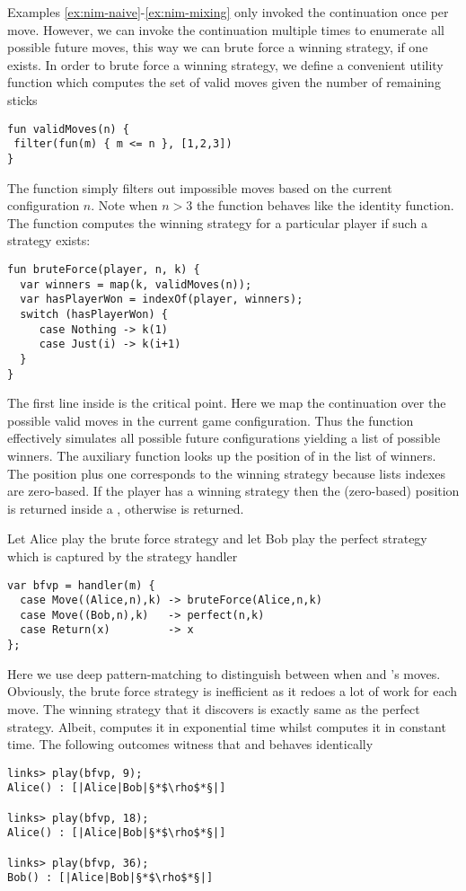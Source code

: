\begin{example}\label{ex:nim-brute-force}
Examples \ref{ex:nim-naive}-\ref{ex:nim-mixing} only invoked the continuation once per move. However, we can invoke the continuation multiple times to enumerate all possible future moves, this way we can brute force a winning strategy, if one exists. In order to brute force a winning strategy, we define a convenient utility function which computes the set of valid moves given the number of remaining sticks
\begin{lstlisting}[style=links]
fun validMoves(n) {
 filter(fun(m) { m <= n }, [1,2,3])
}
\end{lstlisting}
The function simply filters out impossible moves based on the current configuration $n$. Note when $n > 3$ the function  behaves like the identity function.
The function  computes the winning strategy for a particular player if such a strategy exists:
\begin{lstlisting}[style=links]
fun bruteForce(player, n, k) {
  var winners = map(k, validMoves(n));
  var hasPlayerWon = indexOf(player, winners);
  switch (hasPlayerWon) {
     case Nothing -> k(1)
     case Just(i) -> k(i+1)
  }
}
\end{lstlisting}
The first line inside  is the critical point. Here we map the continuation  over the possible valid moves in the current game configuration. Thus the function effectively simulates all possible future configurations yielding a list of possible winners. The auxiliary function  looks up the position of  in the list of winners. The position plus one corresponds to the winning strategy because lists indexes are zero-based. If the player has a winning strategy then the (zero-based) position is returned inside a , otherwise  is returned.

Let Alice play the brute force strategy and let Bob play the perfect strategy which is captured by the strategy handler 
\begin{lstlisting}[style=links]
var bfvp = handler(m) {
  case Move((Alice,n),k) -> bruteForce(Alice,n,k)
  case Move((Bob,n),k)   -> perfect(n,k)
  case Return(x)         -> x
};
\end{lstlisting}
Here we use deep pattern-matching to distinguish between when  and 's moves. Obviously, the brute force strategy is inefficient as it redoes a lot of work for each move. The winning strategy that it discovers is exactly same as the perfect strategy. Albeit,  computes it in exponential time whilst  computes it in constant time. The following outcomes witness that  and  behaves identically
\begin{lstlisting}[style=links]
links> play(bfvp, 9);
Alice() : [|Alice|Bob|§*$\rho$*§|]

links> play(bfvp, 18);
Alice() : [|Alice|Bob|§*$\rho$*§|]

links> play(bfvp, 36);
Bob() : [|Alice|Bob|§*$\rho$*§|]
\end{lstlisting}
\end{example}
